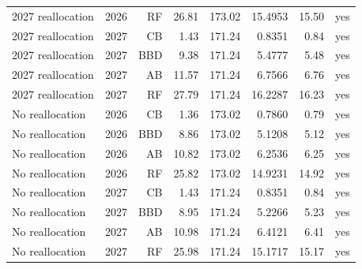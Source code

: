 \begin{table}[htbp]
\begin{tabular}{lrrrrrrr}
2027 reallocation & 2026 & RF & 26.81 & 173.02 & 15.4953 & 15.50 & yes \\
2027 reallocation & 2027 & CB & 1.43 & 171.24 & 0.8351 & 0.84 & yes \\
2027 reallocation & 2027 & BBD & 9.38 & 171.24 & 5.4777 & 5.48 & yes \\
2027 reallocation & 2027 & AB & 11.57 & 171.24 & 6.7566 & 6.76 & yes \\
2027 reallocation & 2027 & RF & 27.79 & 171.24 & 16.2287 & 16.23 & yes \\
No reallocation & 2026 & CB & 1.36 & 173.02 & 0.7860 & 0.79 & yes \\
No reallocation & 2026 & BBD & 8.86 & 173.02 & 5.1208 & 5.12 & yes \\
No reallocation & 2026 & AB & 10.82 & 173.02 & 6.2536 & 6.25 & yes \\
No reallocation & 2026 & RF & 25.82 & 173.02 & 14.9231 & 14.92 & yes \\
No reallocation & 2027 & CB & 1.43 & 171.24 & 0.8351 & 0.84 & yes \\
No reallocation & 2027 & BBD & 8.95 & 171.24 & 5.2266 & 5.23 & yes \\
No reallocation & 2027 & AB & 10.98 & 171.24 & 6.4121 & 6.41 & yes \\
No reallocation & 2027 & RF & 25.98 & 171.24 & 15.1717 & 15.17 & yes \\
\bottomrule
\end{tabular}
\end{table}
